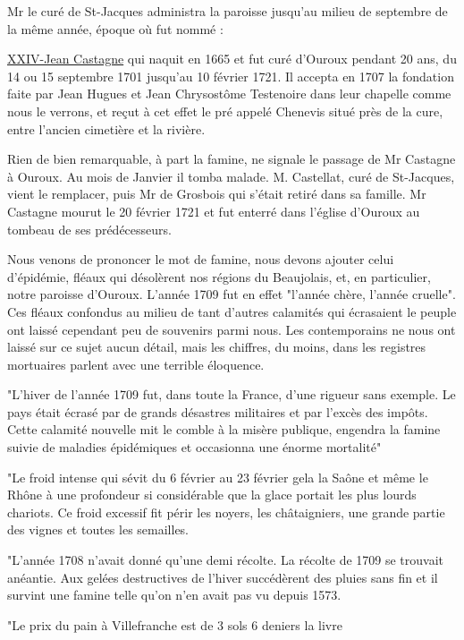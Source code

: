 Mr le curé de St-Jacques administra la paroisse jusqu'au milieu de septembre de la même année, époque où fut nommé :

\underline{XXIV-Jean Castagne} qui naquit en 1665 et fut curé d'Ouroux pendant 20 ans, du 14 ou 15 septembre 1701 jusqu'au 10 février 1721. Il accepta en 1707 la fondation faite par Jean Hugues et Jean Chrysostôme Testenoire dans leur chapelle comme nous le verrons, et reçut à cet effet le pré appelé Chenevis situé près de la cure, entre l'ancien cimetière et la rivière.

Rien de bien remarquable, à part la famine, ne signale le passage de Mr Castagne à Ouroux. Au mois de Janvier il tomba malade. M. Castellat, curé de St-Jacques, vient le remplacer, puis Mr de Grosbois qui s'était retiré dans sa famille. Mr Castagne mourut le 20 février 1721 et fut enterré dans l'église d'Ouroux au tombeau de ses prédécesseurs.

Nous venons de prononcer le mot de famine, nous devons ajouter celui d'épidémie, fléaux qui désolèrent nos régions du Beaujolais, et, en particulier, notre paroisse d'Ouroux. L'année 1709 fut en effet "l'année chère, l'année cruelle". Ces fléaux confondus au milieu de tant d'autres calamités qui écrasaient le peuple ont laissé cependant peu de souvenirs parmi nous. Les contemporains ne nous ont laissé sur ce sujet aucun détail, mais les chiffres, du moins, dans les registres mortuaires parlent avec une terrible éloquence.

"L'hiver de l'année 1709 fut, dans toute la France, d'une rigueur sans exemple. Le pays était écrasé par de grands désastres militaires et par l'excès des impôts. Cette calamité nouvelle mit le comble à la misère publique, engendra la famine suivie de maladies épidémiques et occasionna une énorme mortalité"

"Le froid intense qui sévit du 6 février au 23 février gela la Saône et même le Rhône à une profondeur si considérable que la glace portait les plus lourds chariots. Ce froid excessif fit périr les noyers, les châtaigniers, une grande partie des vignes et toutes les semailles.

"L'année 1708 n'avait donné qu'une demi récolte. La récolte de 1709 se trouvait anéantie. Aux gelées destructives de l'hiver succédèrent des pluies sans fin et il survint une famine telle qu'on n'en avait pas vu depuis 1573.

"Le prix du pain à Villefranche est de 3 sols 6 deniers la livre

